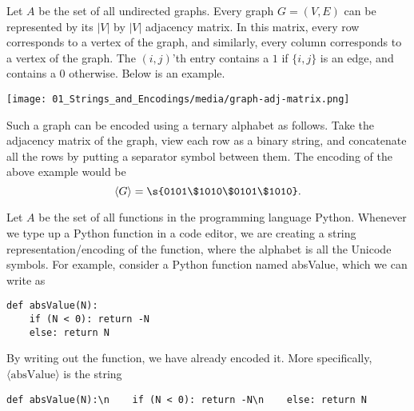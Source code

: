 \begin{flex}
\begin{example} \label{example:Ternary-encoding-of-graphs}
Let $A$ be the set of all undirected graphs. Every graph $G=(V,E)$ can be represented by its $|V|$ by $|V|$ adjacency matrix. In this matrix, every row corresponds to a vertex of the graph, and similarly, every column corresponds to a vertex of the graph. The $(i,j)$'th entry contains a $1$ if $\{i, j\}$ is an edge, and contains a $0$ otherwise. Below is an example.
\begin{center}
    \texttt{[image: 01\_Strings\_and\_Encodings/media/graph-adj-matrix.png]}
\end{center}
Such a graph can be encoded using a ternary alphabet as follows. Take the adjacency matrix of the graph, view each row as a binary string, and concatenate all the rows by putting a separator symbol between them. The encoding of the above example would be
\[
\langle G \rangle = \s{0101\$1010\$0101\$1010}.
\]
\end{example}

\begin{example} \label{example:Encoding-of-Python-functions}
Let $A$ be the set of all functions in the programming language Python. Whenever we type up a Python function in a code editor, we are creating a string representation/encoding of the function, where the alphabet is all the Unicode symbols. For example, consider a Python function named absValue, which we can write as
\begin{verbatim}
def absValue(N):
    if (N < 0): return -N
    else: return N
\end{verbatim}
By writing out the function, we have already encoded it. More specifically, $\langle \text{absValue} \rangle$ is the string
\begin{verbatim}
def absValue(N):\n    if (N < 0): return -N\n    else: return N
\end{verbatim}
\end{example}
\end{flex}



